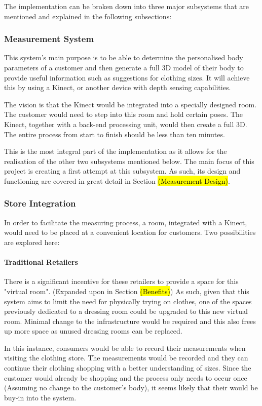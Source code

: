 The implementation can be broken down into three major subsystems that are mentioned and explained in the following subsections:

\subsubsection{Measurement System}
This system's main purpose is to be able to determine the personalised body parameters of a customer and then generate a full 3D model of their body to provide useful information such as suggestions for clothing sizes. It will achieve this by using a Kinect, or another device with depth sensing capabilities. 

The vision is that the Kinect would be integrated into a specially designed room. The customer would need to step into this room and hold certain poses. The Kinect, together with a back-end processing unit, would then create a full 3D. The entire process from start to finish should be less than ten minutes. 

This is the most integral part of the implementation as it allows for the realisation of the other two subsystems mentioned below. The main focus of this project is creating a first attempt at this subsystem. As such, its design and functioning are covered in great detail in Section \hl{(Measurement Design)}. 

\subsubsection{Store Integration}
In order to facilitate the measuring process, a room, integrated with a Kinect, would need to be placed at a convenient location for customers. Two possibilities are explored here:

\paragraph{Traditional Retailers}
There is a significant incentive for these retailers to provide a space for this "virtual room". (Expanded upon in Section \hl{(Benefits)}) As such, given that this system aims to limit the need for physically trying on clothes, one of the spaces previously dedicated to a dressing room could be upgraded to this new virtual room. Minimal change to the infrastructure would be required and this also frees up more space as unused dressing rooms can be replaced. 

In this instance, consumers would be able to record their measurements when visiting the clothing store. The measurements would be recorded and they can continue their clothing shopping with a better understanding of sizes. Since the customer would already be shopping and the process only needs to occur once (Assuming no change to the customer's body), it seems likely that their would be buy-in into the system.

